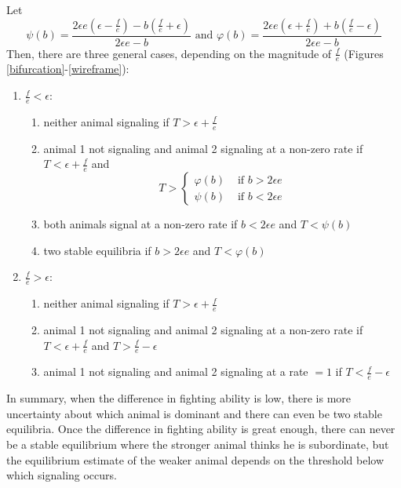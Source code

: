 \documentclass{article}
\begin{document}
Let $$\psi(b)=\frac{2\epsilon e(\epsilon -\frac{f}{e})-b(\frac{f}{e}+\epsilon)}{2\epsilon e-b} \text{ and } \varphi(b)=\frac{ 2\epsilon e(\epsilon+\frac{f}{e})+b(\frac{f}{e}-\epsilon)}{2\epsilon e-b}$$
Then, there are three general cases, depending on the magnitude of $\frac{f}{e}$ (Figures \ref{bifurcation}-\ref{wireframe}):
\begin{enumerate}
\item $\frac{f}{e}<\epsilon$:
\begin{enumerate}
\item neither animal signaling if $T>\epsilon+\frac{f}{e}$
\item animal 1 not signaling and animal 2 signaling at a non-zero rate if $T<\epsilon+\frac{f}{e}$ and 
$$T>\left\{\begin{array}{cccc}
\varphi(b) & \text{ if } b>2\epsilon e
\\ \psi(b) & \text{ if } b<2\epsilon e
\end{array}\right.$$

\item both animals signal at a non-zero rate if $b<2\epsilon e$ and $T<\psi(b)$
\item two stable equilibria if $b>2\epsilon e$ and $T<\varphi(b)$
\end{enumerate}
\item $\frac{f}{e}>\epsilon$:
\begin{enumerate}
\item neither animal signaling if $T>\epsilon+\frac{f}{e}$
\item animal 1 not signaling and animal 2 signaling at a non-zero rate if $T<\epsilon+\frac{f}{e}$ and $T>\frac{f}{e}-\epsilon$
\item animal 1 not signaling and animal 2 signaling at a rate $=1$ if $T<\frac{f}{e}-\epsilon$
\end{enumerate}
\end{enumerate}
In summary, when the difference in fighting ability is low, there is more uncertainty about which animal is dominant and there can even be two stable equilibria.  Once the difference in fighting ability is great enough, there can never be a stable equilibrium where the stronger animal thinks he is subordinate, but the equilibrium estimate of the weaker animal depends on the threshold below which signaling occurs.
\end{document}
